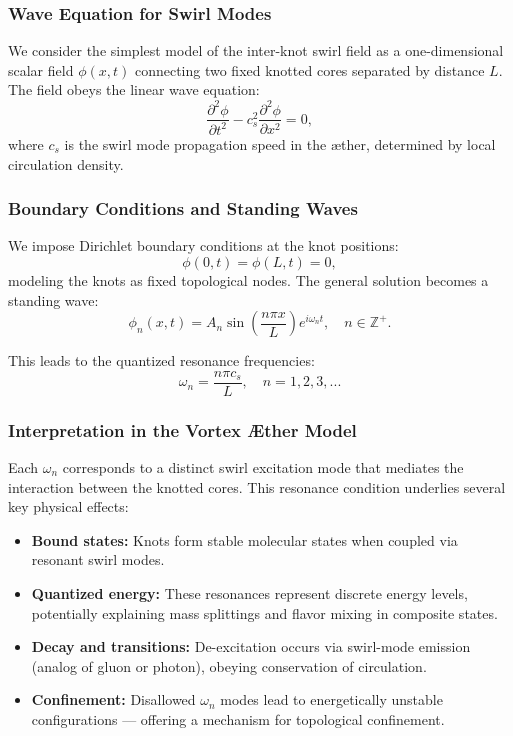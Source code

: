 \subsubsection*{Wave Equation for Swirl Modes}

We consider the simplest model of the inter-knot swirl field as a one-dimensional scalar field \( \phi(x,t) \) connecting two fixed knotted cores separated by distance \( L \). The field obeys the linear wave equation:
\begin{equation}
\frac{\partial^2 \phi}{\partial t^2} - c_s^2 \frac{\partial^2 \phi}{\partial x^2} = 0,
\label{eq:swirl_wave}
\end{equation}
where \( c_s \) is the swirl mode propagation speed in the æther, determined by local circulation density.

\subsubsection*{Boundary Conditions and Standing Waves}

We impose Dirichlet boundary conditions at the knot positions:
\begin{equation}
\phi(0,t) = \phi(L,t) = 0,
\end{equation}
modeling the knots as fixed topological nodes. The general solution becomes a standing wave:
\begin{equation}
\phi_n(x,t) = A_n \sin\left( \frac{n\pi x}{L} \right) e^{i \omega_n t}, \quad n \in \mathbb{Z}^+.
\end{equation}

This leads to the quantized resonance frequencies:
\begin{equation}
\omega_n = \frac{n\pi c_s}{L}, \quad n = 1,2,3,...
\label{eq:resonance}
\end{equation}

\subsubsection*{Interpretation in the Vortex Æther Model}

Each \( \omega_n \) corresponds to a distinct swirl excitation mode that mediates the interaction between the knotted cores. This resonance condition underlies several key physical effects:
\begin{itemize}
    \item \textbf{Bound states:} Knots form stable molecular states when coupled via resonant swirl modes.
    \item \textbf{Quantized energy:} These resonances represent discrete energy levels, potentially explaining mass splittings and flavor mixing in composite states.
    \item \textbf{Decay and transitions:} De-excitation occurs via swirl-mode emission (analog of gluon or photon), obeying conservation of circulation.
    \item \textbf{Confinement:} Disallowed \( \omega_n \) modes lead to energetically unstable configurations — offering a mechanism for topological confinement.
\end{itemize}

